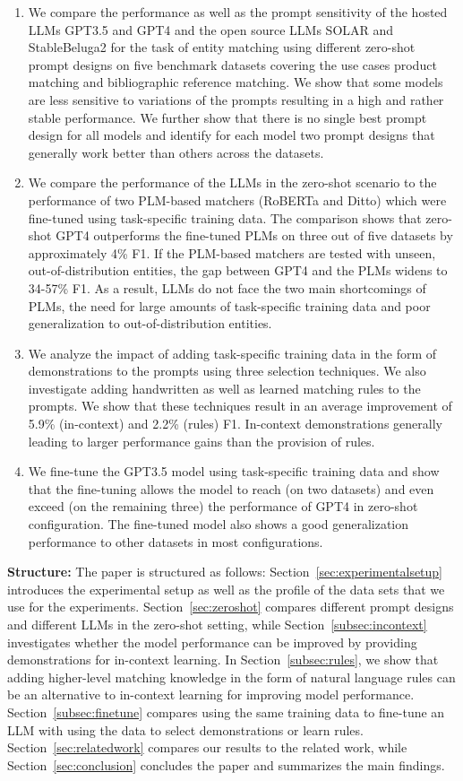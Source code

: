 \documentclass[sigconf,nonacm]{acmart}
\begin{document}
\begin{enumerate}
    \item We compare the performance as well as the prompt sensitivity of the hosted LLMs GPT3.5 and GPT4 and the open source LLMs SOLAR and StableBeluga2 for the task of entity matching using different zero-shot prompt designs on five benchmark datasets covering the use cases product matching and bibliographic reference matching. We show that some models are less sensitive to variations of the prompts resulting in a high and rather stable performance. We further show that there is no single best prompt design for all models and identify for each model two prompt designs that generally work better than others across the datasets.   
    \item We compare the performance of the LLMs in the zero-shot scenario to the performance of two PLM-based matchers (RoBERTa and Ditto) which were fine-tuned using task-specific training data. The comparison shows that zero-shot GPT4 outperforms the fine-tuned PLMs on three out of five datasets by approximately 4\% F1. If the PLM-based matchers are tested with unseen, out-of-distribution entities, the gap between GPT4 and the PLMs widens to 34-57\% F1. As a result, LLMs do not face the two main shortcomings of PLMs, the need for large amounts of task-specific training data and poor generalization to out-of-distribution entities.
\item We analyze the impact of adding task-specific training data in the form of  demonstrations to the prompts using three selection techniques. We also investigate adding handwritten as well as learned matching rules to the prompts. We show that these techniques result in an average improvement of 5.9\% (in-context) and 2.2\% (rules) F1. In-context demonstrations generally leading to larger performance gains than the provision of rules.
    \item We fine-tune the GPT3.5 model using task-specific training data and show that the fine-tuning allows the model to reach (on two datasets) and even exceed (on the remaining three) the performance of GPT4 in zero-shot configuration. The fine-tuned model also shows a good generalization performance to other datasets in most configurations.
\end{enumerate}

\textbf{Structure:} The paper is structured as follows: Section~\ref{sec:experimentalsetup} introduces the experimental setup as well as the profile of the data sets that we use for the experiments. Section~\ref{sec:zeroshot} compares different prompt designs and different LLMs in the zero-shot setting, while Section~\ref{subsec:incontext} investigates whether the model performance can be improved by providing demonstrations for in-context learning. In Section~\ref{subsec:rules}, we show that adding higher-level matching knowledge in the form of natural language rules can be an alternative to in-context learning for improving model performance. Section~\ref{subsec:finetune} compares using the same training data to fine-tune an LLM with using the data to select demonstrations or learn rules.
Section~\ref{sec:relatedwork} compares our results to the related work, while Section~\ref{sec:conclusion} concludes the paper and summarizes the main findings. 
\end{document}
